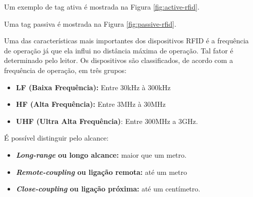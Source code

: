 Um exemplo de tag ativa é mostrada na Figura \ref{fig:active-rfid}.


Uma tag passiva é mostrada na Figura \ref{fig:passive-rfid}.




Uma das características mais importantes dos dispositivos RFID é a frequência de operação já que 
ela influi no distância máxima de operação. Tal fator é determinado pelo leitor. 
Os dispositivos são classificados, de acordo com a frequência de operação, em três grupos:

\begin{itemize} \parskip -4pt
	\item \textbf{LF (Baixa Frequência):} Entre 30kHz à 300kHz
	\item \textbf{HF (Alta Frequência):} Entre 3MHz à 30MHz
	\item \textbf{UHF (Ultra Alta Frequência)}: Entre 300MHz a 3GHz.
\end{itemize}

É possível distinguir pelo alcance:

\begin{itemize} \parskip -4pt
	\item \textbf{\textit{Long-range} ou longo alcance:} maior que um metro.
	\item \textbf{\textit{Remote-coupling} ou ligação remota:} até um metro
	\item \textbf{\textit{Close-coupling} ou ligação próxima:} até um centímetro.
\end{itemize}

